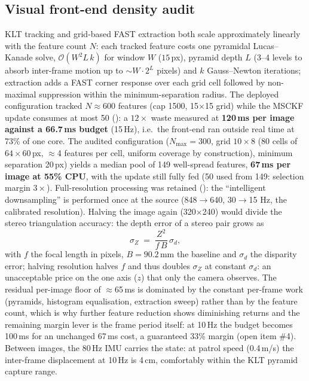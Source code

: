 \subsection{Visual front-end density audit}
\label{sec:frontend}
KLT tracking and grid-based FAST extraction both scale approximately linearly
with the feature count $N$: each tracked feature costs one pyramidal
Lucas--Kanade solve, $\mathcal{O}(W^2 L\, k)$ for window $W$ ($15$\,px),
pyramid depth $L$ (3--4 levels to absorb inter-frame motion up to
$\sim W\cdot 2^{L}$ pixels) and $k$ Gauss--Newton iterations; extraction adds
a FAST corner response over each grid cell followed by non-maximal
suppression within the minimum-separation radius. The deployed
configuration tracked $N \approx 600$ features (cap 1500, 15$\times$15 grid)
while the MSCKF update consumes at most 50 (): a
$12\times$ waste measured at \textbf{120\,ms per image against a 66.7\,ms
budget} (15\,Hz), i.e.\ the front-end ran outside real time at 73\% of one
core. The audited configuration
($N_{\max}{=}300$, grid $10\times8$ (80 cells of $64\times60$\,px,
$\approx$4 features per cell, uniform coverage by construction),
minimum separation 20\,px) yields a median pool of 149 well-spread
features, \textbf{67\,ms per image at 55\% CPU}, with the update still fully
fed (50 used from 149: selection margin $3\times$). Full-resolution processing
was retained (): the ``intelligent downsampling'' is
performed once at the source (848$\rightarrow$640, 30$\rightarrow$15 Hz, the
calibrated resolution). Halving the image again (320$\times$240) would divide
the stereo triangulation accuracy: the depth error of a stereo pair grows as
\begin{equation}
\sigma_Z \;=\; \frac{Z^{2}}{f\,B}\,\sigma_{d},
\end{equation}
with $f$ the focal length in pixels, $B = 90.2$\,mm the baseline and
$\sigma_d$ the disparity error; halving resolution halves $f$ and thus
doubles $\sigma_Z$ at constant $\sigma_d$: an unacceptable price on the
one axis ($z$) that only the camera observes. The residual per-image floor of
$\approx$65\,ms is dominated by the constant per-frame work (pyramids,
histogram equalisation, extraction sweep) rather than by the feature count,
which is why further feature reduction shows diminishing returns and the
remaining margin lever is the frame period itself: at 10\,Hz the budget
becomes 100\,ms for an unchanged 67\,ms cost, a guaranteed 33\% margin
(open item \#4). Between images, the 80\,Hz IMU carries the state: at
patrol speed (0.4\,m/s) the inter-frame displacement at 10\,Hz is 4\,cm,
comfortably within the KLT pyramid capture range.

